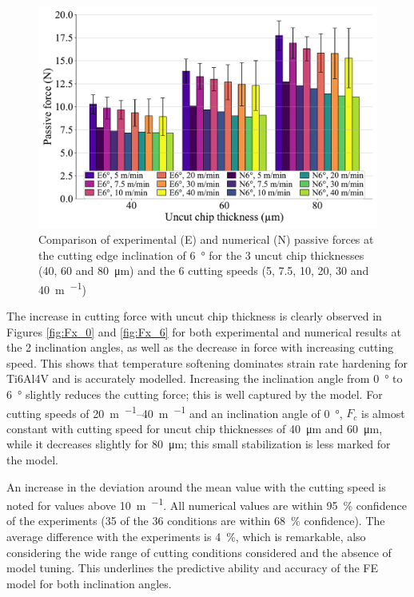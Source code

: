 \documentclass[preprint,12pt,times]{elsarticle}
\begin{document}
\begin{figure}[!h]
\centering
\includegraphics[width = 140 mm]{Figures/Fz_6}
\caption{Comparison of experimental (E) and numerical (N) passive forces at the cutting edge inclination of \qty{6}{\degree} for the 3 uncut chip thicknesses (40, 60 and \qty{80}{\um}) and the 6 cutting speeds (5, 7.5, 10, 20, 30 and \qty{40}{\m\per\min})}
\label{fig:Fz_6}
\end{figure}

The increase in cutting force with uncut chip thickness is clearly observed in Figures \ref{fig:Fx_0} and \ref{fig:Fx_6} for both experimental and numerical results at the 2 inclination angles, as well as the decrease in force with increasing cutting speed. This shows that temperature softening dominates strain rate hardening for Ti6Al4V and is accurately modelled. Increasing the inclination angle from \qty{0}{\degree} to \qty{6}{\degree} slightly reduces the cutting force; this is well captured by the model. For cutting speeds of \qtyrange{20}{40}{\m\per\min} and an inclination angle of \qty{0}{\degree}, $F_c$ is almost constant with cutting speed for uncut chip thicknesses of \qty{40}{\um} and \qty{60}{\um}, while it decreases slightly for \qty{80}{\um}; this small stabilization is less marked for the model.

An increase in the deviation around the mean value with the cutting speed is noted for values above \qty{10}{\m\per\min}. All numerical values are within \qty{95}{\%} confidence of the experiments (35 of the 36 conditions are within \qty{68}{\%} confidence). The average difference with the experiments is \qty{4}{\%}, which is remarkable, also considering the wide range of cutting conditions considered and the absence of model tuning. This underlines the predictive ability and accuracy of the FE model for both inclination angles.
\end{document}

